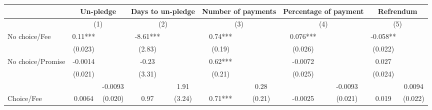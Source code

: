 \begin{tabular}{rrrrrrrrrrr}
\toprule
      & \multicolumn{2}{c}{Un-pledge} & \multicolumn{2}{c}{Days to un-pledge} & \multicolumn{2}{c}{Number of payments} & \multicolumn{2}{c}{Percentage of payment} & \multicolumn{2}{c}{Refrendum} \\
\midrule
\midrule
\multicolumn{1}{l}{} & \multicolumn{2}{c}{(1)} & \multicolumn{2}{c}{(2)} & \multicolumn{2}{c}{(3)} & \multicolumn{2}{c}{(4)} & \multicolumn{2}{c}{(5)} \\
\midrule
\midrule
\multicolumn{1}{l}{No choice/Fee} & \multicolumn{1}{c}{0.11***} & \multicolumn{1}{c}{} & \multicolumn{1}{c}{-8.61***} & \multicolumn{1}{c}{} & \multicolumn{1}{c}{0.74***} & \multicolumn{1}{c}{} & \multicolumn{1}{c}{0.076***} & \multicolumn{1}{c}{} & \multicolumn{1}{c}{-0.058**} & \multicolumn{1}{c}{} \\
      & \multicolumn{1}{c}{(0.023)} & \multicolumn{1}{c}{} & \multicolumn{1}{c}{(2.83)} & \multicolumn{1}{c}{} & \multicolumn{1}{c}{(0.19)} & \multicolumn{1}{c}{} & \multicolumn{1}{c}{(0.026)} & \multicolumn{1}{c}{} & \multicolumn{1}{c}{(0.022)} & \multicolumn{1}{c}{} \\
\multicolumn{1}{l}{No choice/Promise} & \multicolumn{1}{c}{-0.0014} & \multicolumn{1}{c}{} & \multicolumn{1}{c}{-0.23} & \multicolumn{1}{c}{} & \multicolumn{1}{c}{0.62***} & \multicolumn{1}{c}{} & \multicolumn{1}{c}{-0.0072} & \multicolumn{1}{c}{} & \multicolumn{1}{c}{0.027} & \multicolumn{1}{c}{} \\
\multicolumn{1}{l}{} & \multicolumn{1}{c}{(0.021)} & \multicolumn{1}{c}{} & \multicolumn{1}{c}{(3.31)} & \multicolumn{1}{c}{} & \multicolumn{1}{c}{(0.21)} & \multicolumn{1}{c}{} & \multicolumn{1}{c}{(0.025)} & \multicolumn{1}{c}{} & \multicolumn{1}{c}{(0.024)} & \multicolumn{1}{c}{} \\
      &       & \multicolumn{1}{c}{\cellcolor[rgb]{ .949,  .949,  .949} -0.0093} &       & \multicolumn{1}{c}{\cellcolor[rgb]{ .949,  .949,  .949} 1.91} &       & \multicolumn{1}{c}{\cellcolor[rgb]{ .949,  .949,  .949} 0.28} &       & \multicolumn{1}{c}{\cellcolor[rgb]{ .949,  .949,  .949} -0.0093} &       & \multicolumn{1}{c}{\cellcolor[rgb]{ .949,  .949,  .949} 0.0094} \\
\multicolumn{1}{l}{Choice/Fee} & \multicolumn{1}{c}{0.0064} & \multicolumn{1}{c}{\cellcolor[rgb]{ .949,  .949,  .949} (0.020)} & \multicolumn{1}{c}{0.97} & \multicolumn{1}{c}{\cellcolor[rgb]{ .949,  .949,  .949} (3.24)} & \multicolumn{1}{c}{0.71***} & \multicolumn{1}{c}{\cellcolor[rgb]{ .949,  .949,  .949} (0.21)} & \multicolumn{1}{c}{-0.0025} & \multicolumn{1}{c}{\cellcolor[rgb]{ .949,  .949,  .949} (0.021)} & \multicolumn{1}{c}{0.019} & \multicolumn{1}{c}{\cellcolor[rgb]{ .949,  .949,  .949} (0.022)} \\

\end{tabular}
